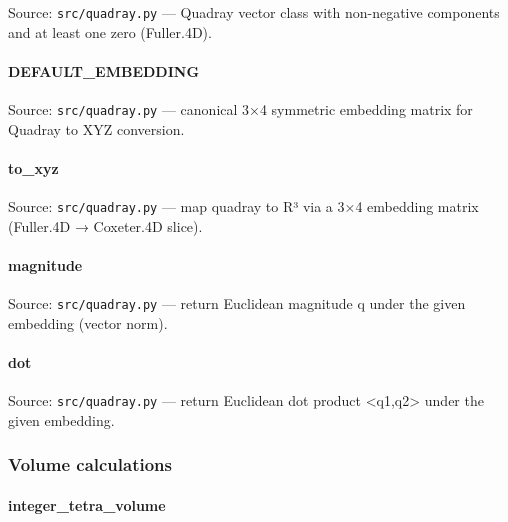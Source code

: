 \documentclass[
  10pt,
]{article}
\newcommand{\passthrough}[1]{#1}
\renewcommand{\texttt}[1]{%
    \colorbox{codebg}{\color{codefg}\ttfamily #1}%
}
\begin{document}
Source: \passthrough{\lstinline!src/quadray.py!} --- Quadray vector
class with non-negative components and at least one zero (Fuller.4D).

\hypertarget{code:DEFAULT_EMBEDDING}{%
\paragraph{\texorpdfstring{\texttt{DEFAULT\_EMBEDDING}}{DEFAULT\_EMBEDDING}}\label{code:DEFAULT_EMBEDDING}}

Source: \passthrough{\lstinline!src/quadray.py!} --- canonical 3×4
symmetric embedding matrix for Quadray to XYZ conversion.

\hypertarget{code:to_xyz}{%
\paragraph{\texorpdfstring{\texttt{to\_xyz}}{to\_xyz}}\label{code:to_xyz}}

Source: \passthrough{\lstinline!src/quadray.py!} --- map quadray to R³
via a 3×4 embedding matrix (Fuller.4D → Coxeter.4D slice).

\hypertarget{code:magnitude}{%
\paragraph{\texorpdfstring{\texttt{magnitude}}{magnitude}}\label{code:magnitude}}

Source: \passthrough{\lstinline!src/quadray.py!} --- return Euclidean
magnitude \textbar\textbar q\textbar\textbar{} under the given embedding
(vector norm).

\hypertarget{code:dot}{%
\paragraph{\texorpdfstring{\texttt{dot}}{dot}}\label{code:dot}}

Source: \passthrough{\lstinline!src/quadray.py!} --- return Euclidean
dot product \textless q1,q2\textgreater{} under the given embedding.

\hypertarget{code:volume_calculations}{%
\subsubsection{Volume calculations}\label{code:volume_calculations}}

\hypertarget{code:integer_tetra_volume}{%
\paragraph{\texorpdfstring{\texttt{integer\_tetra\_volume}}{integer\_tetra\_volume}}\label{code:integer_tetra_volume}}
\end{document}
